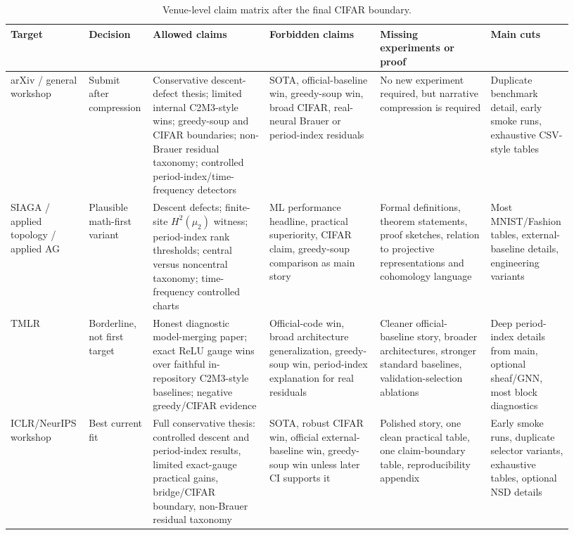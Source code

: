 \begin{table}[t]
\centering
\small
\caption{Venue-level claim matrix after the final CIFAR boundary.}
\label{tab:venue-claim-matrix-after-35791f7}
\begin{tabular}{p{0.13\linewidth}p{0.11\linewidth}p{0.20\linewidth}p{0.19\linewidth}p{0.19\linewidth}p{0.11\linewidth}}
\hline
Target & Decision & Allowed claims & Forbidden claims & Missing experiments or proof & Main cuts \\
\hline
arXiv / general workshop & Submit after compression & Conservative descent-defect thesis; limited internal C2M3-style wins; greedy-soup and CIFAR boundaries; non-Brauer residual taxonomy; controlled period-index/time-frequency detectors & SOTA, official-baseline win, greedy-soup win, broad CIFAR, real-neural Brauer or period-index residuals & No new experiment required, but narrative compression is required & Duplicate benchmark detail, early smoke runs, exhaustive CSV-style tables \\
\hline
SIAGA / applied topology / applied AG & Plausible math-first variant & Descent defects; finite-site \(H^2(\mu_2)\) witness; period-index rank thresholds; central versus noncentral taxonomy; time-frequency controlled charts & ML performance headline, practical superiority, CIFAR claim, greedy-soup comparison as main story & Formal definitions, theorem statements, proof sketches, relation to projective representations and cohomology language & Most MNIST/Fashion tables, external-baseline details, engineering variants \\
\hline
TMLR & Borderline, not first target & Honest diagnostic model-merging paper; exact ReLU gauge wins over faithful in-repository C2M3-style baselines; negative greedy/CIFAR evidence & Official-code win, broad architecture generalization, greedy-soup win, period-index explanation for real residuals & Cleaner official-baseline story, broader architectures, stronger standard baselines, validation-selection ablations & Deep period-index details from main, optional sheaf/GNN, most block diagnostics \\
\hline
ICLR/NeurIPS workshop & Best current fit & Full conservative thesis: controlled descent and period-index results, limited exact-gauge practical gains, bridge/CIFAR boundary, non-Brauer residual taxonomy & SOTA, robust CIFAR win, official external-baseline win, greedy-soup win unless later CI supports it & Polished story, one clean practical table, one claim-boundary table, reproducibility appendix & Early smoke runs, duplicate selector variants, exhaustive tables, optional NSD details \\

\end{tabular}
\end{table}
